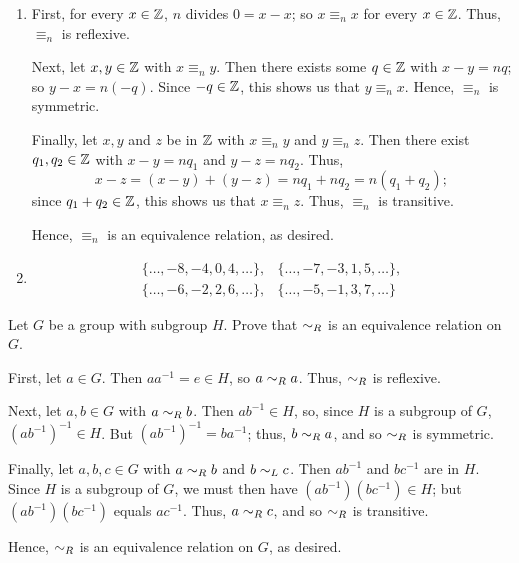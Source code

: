 \begin{solution}[print=true]
\begin{enumerate}
\item First, for every $x \in \mathbb{Z}$, $n$
    divides $0=x-x$; so $x\equiv_n x$ for every $x\in
    \mathbb{Z}$.  Thus, $\equiv_n$ is reflexive.

Next, let $x,y \in \mathbb{Z}$ with $x\equiv_n y$.  Then
there exists some $q\in \mathbb{Z}$ with $x-y=nq$; so $y-x=n(-q)$.
Since $-q\in \mathbb{Z}$, this shows us that $y\equiv_n x$.  Hence,
$\equiv_n$ is symmetric.

Finally, let $x,y$ and $z$ be in $\mathbb{Z}$ with $x\equiv_n
y$ and $y\equiv_nz$.  Then there exist $q_1,q_2 \in \mathbb{Z}$ with
$x-y=nq_1$ and $y-z=nq_2$.  Thus,
$$x-z=(x-y)+(y-z)=nq_1+nq_2=n(q_1+q_2);$$ since $q_1+q_2 \in \mathbb{Z}$,
this shows us that $x\equiv_n z$.  Thus, $\equiv_n$ is transitive.

Hence, $\equiv_n$ is an equivalence relation, as desired.

\item

\begin{align*} \{\ldots,-8,-4,0,4,\ldots\},&
\{\ldots,-7,-3,1,5,\ldots\},\\
\{\ldots,-6,-2,2,6,\ldots\},&
\{\ldots,-5,-1,3,7,\ldots\}\end{align*}
\end{enumerate}
\end{solution}

\begin{exercise} Let $G$ be a group with subgroup $H$. Prove that $\sim_R$ is an equivalence relation on $G$.
\end{exercise}

\begin{solution}[print=true]
First, let $a\in G$.  Then $aa^{-1}=e\in H$,
so $a\sim_R a$. Thus, $\sim_R$ is reflexive.

Next, let $a,b\in G$ with $a\sim_R b$.  Then
$ab^{-1}\in H$, so, since $H$ is a subgroup of $G$,
$(ab^{-1})^{-1}\in H$.  But
$(ab^{-1})^{-1}=ba^{-1}$; thus, $b\sim_R a$, and so $\sim_R$ is symmetric.

Finally, let $a,b,c\in G$ with $a\sim_R b$
and $b\sim_L c$. Then $ab^{-1}$ and $bc^{-1}$ are in $H$.  Since
$H$ is a subgroup of $G$, we must then have
$(ab^{-1})(bc^{-1})\in H$; but $(ab^{-1})(bc^{-1})$ equals
 $ac^{-1}$. Thus, $a\sim_R c$, and so $\sim_R$ is transitive.

Hence, $\sim_R$ is an equivalence relation on $G$, as desired.
\end{solution}

